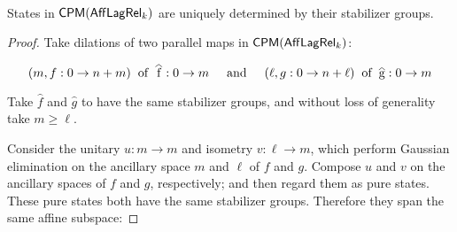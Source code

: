 \begin{proposition}~\\
\label{prop:uniqueness}
States in $\mathsf{CPM}(\mathsf{Aff}\mathsf{Lag}\mathsf{Rel}_k)$ are uniquely determined by their stabilizer groups.
\end{proposition}
\begin{proof}

Take dilations of two parallel maps in $\mathsf{CPM}(\mathsf{Aff}\mathsf{Lag}\mathsf{Rel}_k)$:

$$
(m,f:0\to n+m) \hspace*{.2cm}  
\text{of} \hspace*{.2cm} \hat f:0\to m 
\hspace*{.5cm}
\text{and}
\hspace*{.5cm}
(\ell, g:0\to n+\ell)
\hspace*{.2cm}  \text{of} \hspace*{.2cm}
\hat g:0\to m
$$ 

Take  $\hat f$ and $\hat g$ to have the same stabilizer groups, and without loss of generality take $m\geq \ell$. 

Consider the unitary  $u:m\to m$  and isometry $v:\ell\to m$, which perform Gaussian elimination on the ancillary space $m$ and $\ell$ of $f$ and $g$.  Compose $u$ and $v$ on the ancillary spaces of $f$ and $g$, respectively; and then regard them as pure states.  These pure states both have the same stabilizer groups.  Therefore they span the same affine subspace:


\end{proof}
